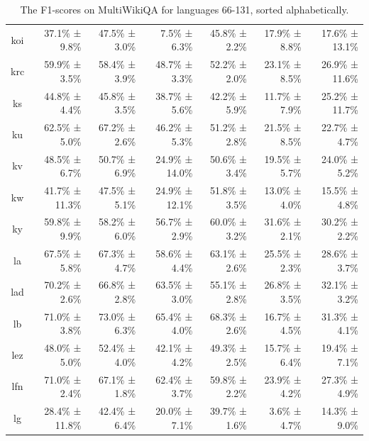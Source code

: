 \documentclass[10pt, a4paper]{article}
\begin{document}
\begin{table}[h]
\begin{tabular}{crrrrrr}
koi & 37.1\% ± 9.8\% & 47.5\% ± 3.0\% & 7.5\% ± 6.3\% & 45.8\% ± 2.2\% & 17.9\% ± 8.8\% & 17.6\% ± 13.1\% \\
krc & 59.9\% ± 3.5\% & 58.4\% ± 3.9\% & 48.7\% ± 3.3\% & 52.2\% ± 2.0\% & 23.1\% ± 8.5\% & 26.9\% ± 11.6\% \\
ks & 44.8\% ± 4.4\% & 45.8\% ± 3.5\% & 38.7\% ± 5.6\% & 42.2\% ± 5.9\% & 11.7\% ± 7.9\% & 25.2\% ± 11.7\% \\
ku & 62.5\% ± 5.0\% & 67.2\% ± 2.6\% & 46.2\% ± 5.3\% & 51.2\% ± 2.8\% & 21.5\% ± 8.5\% & 22.7\% ± 4.7\% \\
kv & 48.5\% ± 6.7\% & 50.7\% ± 6.9\% & 24.9\% ± 14.0\% & 50.6\% ± 3.4\% & 19.5\% ± 5.7\% & 24.0\% ± 5.2\% \\
kw & 41.7\% ± 11.3\% & 47.5\% ± 5.1\% & 24.9\% ± 12.1\% & 51.8\% ± 3.5\% & 13.0\% ± 4.0\% & 15.5\% ± 4.8\% \\
ky & 59.8\% ± 9.9\% & 58.2\% ± 6.0\% & 56.7\% ± 2.9\% & 60.0\% ± 3.2\% & 31.6\% ± 2.1\% & 30.2\% ± 2.2\% \\
la & 67.5\% ± 5.8\% & 67.3\% ± 4.7\% & 58.6\% ± 4.4\% & 63.1\% ± 2.6\% & 25.5\% ± 2.3\% & 28.6\% ± 3.7\% \\
lad & 70.2\% ± 2.6\% & 66.8\% ± 2.8\% & 63.5\% ± 3.0\% & 55.1\% ± 2.8\% & 26.8\% ± 3.5\% & 32.1\% ± 3.2\% \\
lb & 71.0\% ± 3.8\% & 73.0\% ± 6.3\% & 65.4\% ± 4.0\% & 68.3\% ± 2.6\% & 16.7\% ± 4.5\% & 31.3\% ± 4.1\% \\
lez & 48.0\% ± 5.0\% & 52.4\% ± 4.0\% & 42.1\% ± 4.2\% & 49.3\% ± 2.5\% & 15.7\% ± 6.4\% & 19.4\% ± 7.1\% \\
lfn & 71.0\% ± 2.4\% & 67.1\% ± 1.8\% & 62.4\% ± 3.7\% & 59.8\% ± 2.2\% & 23.9\% ± 4.2\% & 27.3\% ± 4.9\% \\
lg & 28.4\% ± 11.8\% & 42.4\% ± 6.4\% & 20.0\% ± 7.1\% & 39.7\% ± 1.6\% & 3.6\% ± 4.7\% & 14.3\% ± 9.0\% \\
\bottomrule
\end{tabular}
\caption{The F1-scores on MultiWikiQA for languages 66-131, sorted alphabetically.}
\label{tab:num-samples-in-small-subsets}
\end{table}
\end{document}
